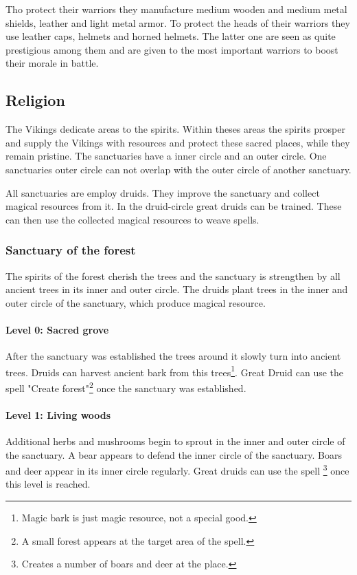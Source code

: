 \documentclass[a4paper]{book}
\begin{document}
	Tho protect their warriors they manufacture medium wooden and medium metal shields,
	leather and light metal armor.
	To protect the heads of their warriors they use leather caps, helmets and horned helmets.
	The latter one are seen as quite prestigious among them and are given to the most important
	warriors to boost their morale in battle.

	\subsection{Religion}
		The \gls{Vikings} dedicate areas to the spirits.
		Within theses areas the spirits prosper and supply the \gls{Vikings}
		with resources and protect these sacred places,
		while they remain pristine.
		The sanctuaries have a inner circle and an outer circle.
		One sanctuaries outer circle can not overlap with the outer circle of another sanctuary.

		All sanctuaries are employ druids.
		They improve the sanctuary and collect magical resources from it.
		In the druid-circle great druids can be trained.
		These can then use the collected magical resources to weave spells.

		\subsubsection{Sanctuary of the forest}
			The spirits of the forest cherish the trees and the sanctuary is strengthen by
			all ancient trees in its inner and outer circle.
			The druids plant trees in the inner and outer circle of the sanctuary,
			which produce magical resource.

			\paragraph{Level 0: Sacred grove}
				After the sanctuary was established the trees around it slowly turn into ancient trees.
				Druids can harvest ancient bark from this trees\footnote{
					Magic bark is just magic resource, not a special good.
				}.
				Great Druid can use the spell "Create forest"\footnote{
					A small forest appears at the target area of the spell.
				} once the sanctuary was established.

			\paragraph{Level 1: Living woods}
				Additional herbs and mushrooms begin to sprout in the inner and outer circle
				of the sanctuary.
				A bear appears to defend the inner circle of the sanctuary.
				Boars and deer appear in its inner circle regularly.
				Great druids can use the spell \footnote{
					Creates a number of boars and deer at the place.
				} once this level is reached.
\end{document}
